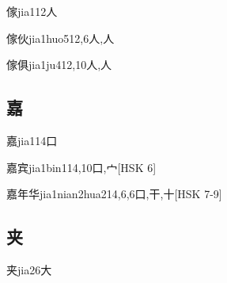 \begin{EntryWithPhonetic}{傢}{jia1}{12}{⼈}
\end{EntryWithPhonetic}

\begin{EntryWithPhonetic}{傢伙}{jia1huo5}{12,6}{⼈,⼈}
\end{EntryWithPhonetic}

\begin{EntryWithPhonetic}{傢俱}{jia1ju4}{12,10}{⼈,⼈}
\end{EntryWithPhonetic}

\subsection*{嘉}

\begin{EntryWithPhonetic}{嘉}{jia1}{14}{⼝}
\end{EntryWithPhonetic}

\begin{EntryWithPhonetic}{嘉宾}{jia1bin1}{14,10}{⼝,⼧}[HSK 6]
\end{EntryWithPhonetic}

\begin{EntryWithPhonetic}{嘉年华}{jia1nian2hua2}{14,6,6}{⼝,⼲,⼗}[HSK 7-9]
\end{EntryWithPhonetic}

\subsection*{夹}

\begin{EntryWithPhonetic}{夹}{jia2}{6}{⼤}
\end{EntryWithPhonetic}

